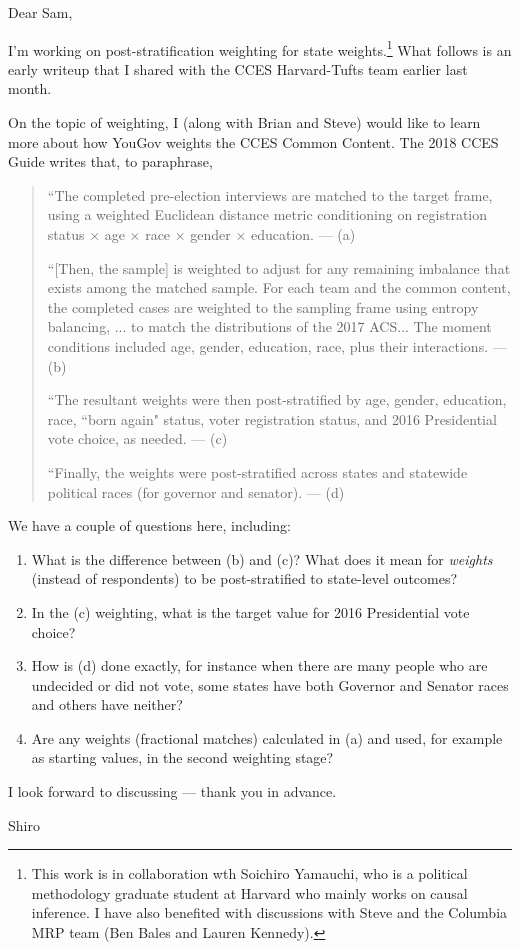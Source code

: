 \documentclass[10pt]{letter}
\begin{document}
\begin{letter}{}
\opening{Dear Sam,} 

I'm working on post-stratification weighting for state weights.\footnote{This work is in collaboration wth Soichiro Yamauchi, who is a political methodology graduate student at Harvard who mainly works on causal inference. I have also benefited with discussions with Steve and the Columbia MRP team (Ben Bales and Lauren Kennedy).} What follows is an early writeup that I shared with the CCES Harvard-Tufts team earlier last month.  

On the topic of weighting,  I (along with Brian and Steve) would like to learn more about how YouGov weights the CCES Common Content. The 2018 CCES Guide writes that, to paraphrase,

\begin{quote}
``The completed pre-election interviews are matched to the target frame, using a weighted Euclidean distance metric conditioning on registration status × age × race × gender × education. --- (a)
\medskip

``[Then, the sample] is weighted to adjust for any remaining imbalance that exists among the matched sample. For each team and the common content, the completed cases are weighted to the sampling frame using entropy balancing, ... to match the distributions of the 2017 ACS... The moment conditions included age, gender, education, race, plus their interactions. --- (b)
\medskip

``The resultant weights were then post-stratified by age, gender, education, race, “born again" status, voter registration status, and 2016 Presidential vote choice, as needed.  --- (c)
\medskip

``Finally, the weights were post-stratified across states and statewide political races (for governor and senator).  --- (d)
\end{quote}

We have a couple of questions here, including:
\begin{enumerate}
\item What is the difference between (b) and (c)? What does it mean for \emph{weights} (instead of respondents) to be post-stratified to state-level outcomes?
\item In the (c) weighting, what is the target value for 2016 Presidential vote choice?
\item How is (d) done exactly, for instance when there are many people who are undecided or did not vote, some states have both Governor and Senator races and others have neither?
\item Are any weights (fractional matches) calculated in (a) and used, for example as starting values, in the second weighting stage?
\end{enumerate}




I look forward to discussing --- thank you in advance.

Shiro
\end{letter}
\end{document}
